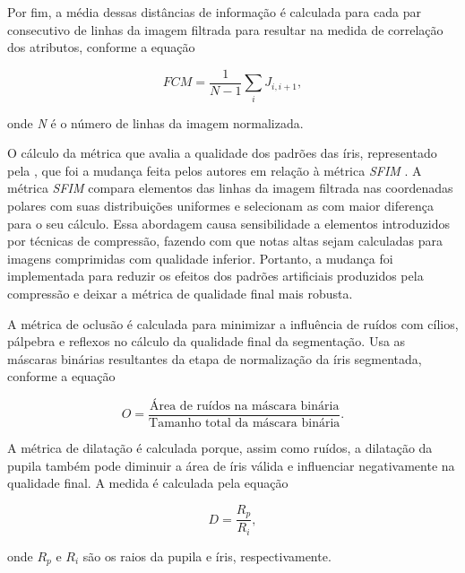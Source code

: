 \par Por fim, a média dessas distâncias de informação é calculada para cada par consecutivo de linhas da imagem filtrada para resultar na medida de correlação dos atributos, conforme a equação

\begin{equation}\label{eq:fce:fcm5}
    FCM = \frac{1}{N - 1}\sum_{i}J_{i, i+1},
\end{equation}

\noindent onde \textit{N} é o número de linhas da imagem normalizada. 

\par O cálculo da métrica que avalia a qualidade dos padrões das íris, representado pela , que foi a mudança feita pelos autores em relação à métrica \textit{\acrshort{SFIM}} \cite{belcher2008}. A métrica \textit{\acrshort{SFIM}} compara elementos das linhas da imagem filtrada nas coordenadas polares com suas distribuições uniformes e selecionam as com maior diferença para o seu cálculo. Essa abordagem causa sensibilidade a elementos introduzidos por técnicas de compressão, fazendo com que notas altas sejam calculadas para imagens comprimidas com qualidade inferior. Portanto, a mudança foi implementada para reduzir os efeitos dos padrões artificiais produzidos pela compressão e deixar a métrica de qualidade final mais robusta.

\par A métrica de oclusão é calculada para minimizar a influência de ruídos com cílios, pálpebra e reflexos no cálculo da qualidade final da segmentação. Usa as máscaras binárias resultantes da etapa de normalização da íris segmentada, conforme a equação

\begin{equation}\label{eq:fce:O}
    O = \frac{\text{Área de ruídos na máscara binária}}{\text{Tamanho total da máscara binária}}.
\end{equation}

\par A métrica de dilatação é calculada porque, assim como ruídos, a dilatação da pupila também pode diminuir a área de íris válida e influenciar negativamente na qualidade final.
A medida é calculada pela equação

\begin{equation}\label{eq:fce:D}
    D = \frac{R_{p}}{R_{i}},
\end{equation}

\noindent onde $R_{p}$ e $R_{i}$ são os raios da pupila e íris, respectivamente.

